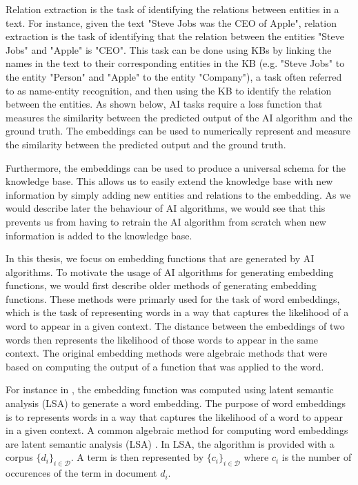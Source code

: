 \begin{itemize}
    \par Relation extraction is the task of identifying the relations between entities in a text.
    For instance, given the text "Steve Jobs was the CEO of Apple", relation extraction is the task of identifying that
    the relation between the entities "Steve Jobs" and "Apple" is "CEO".
    This task can be done using KBs by linking the names in the text to their corresponding entities in the KB (e.g. "Steve Jobs" to the entity "Person"
    and "Apple" to the entity "Company"), a task often referred to as name-entity recognition, and then using the KB to identify the relation between the entities.
    As shown below, AI tasks require a loss function that measures the similarity between 
    the predicted output of the AI algorithm and the ground truth.
    The embeddings can be used to numerically represent and measure the similarity between the predicted output and the ground truth.    
\end{itemize}

Furthermore, the embeddings can be used to produce a universal schema for the knowledge base. 
This allows us to easily extend the knowledge base with new information by simply adding new entities and relations to the embedding. As we would describe later
the behaviour of AI algorithms, we would see that this prevents us from having to retrain the AI algorithm from scratch when new information is added to the knowledge base.

In this thesis, we focus on embedding functions that are generated by AI algorithms. To motivate
the usage of AI algorithms for generating embedding functions, we would first describe older methods of generating embedding functions.
These methods were primarly used for the task of word embeddings, which is the task of representing words in a way that captures the 
likelihood of a word to appear in a given context. The distance between the embeddings of two words then represents the likelihood
of those words to appear in the same context.
The original embedding methods were algebraic methods that were based on computing the output of a function that was applied to the word.

For instance in \cite{LatentSemanticAnalysis}, the embedding function was computed using latent semantic analysis (LSA) to generate a word embedding.
The purpose of word embeddings is to represents words in a way that captures the likelihood of a word to appear in a given context.
A common algebraic method for computing word embeddings are latent semantic analysis (LSA) \cite{LatentSemanticAnalysis}.
In LSA, the algorithm is provided with a corpus $\{d_i\}_{i\in\mathcal{D}}$.
A term is then represented by $\{c_i\}_{i\in\mathcal{D}}$ where
$c_i$ is the number of occurences of the term in document $d_i$.

